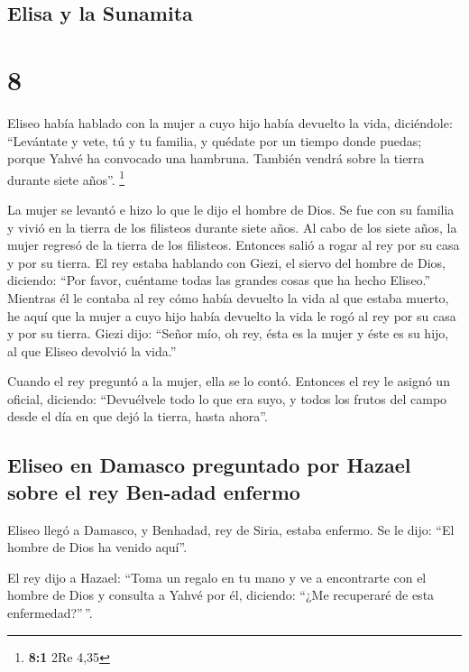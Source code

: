 \hypertarget{elisa-y-la-sunamita}{%
\subsection{Elisa y la Sunamita}\label{elisa-y-la-sunamita}}

\hypertarget{section-7}{%
\section{8}\label{section-7}}

 Eliseo había hablado con la mujer a cuyo hijo había
devuelto la vida, diciéndole: ``Levántate y vete, tú y tu familia, y
quédate por un tiempo donde puedas; porque Yahvé ha convocado una
hambruna. También vendrá sobre la tierra durante siete años''.
\footnote{\textbf{8:1} 2Re 4,35}

 La mujer se levantó e hizo lo que le dijo el hombre de
Dios. Se fue con su familia y vivió en la tierra de los filisteos
durante siete años.  Al cabo de los siete años, la mujer
regresó de la tierra de los filisteos. Entonces salió a rogar al rey por
su casa y por su tierra.  El rey estaba hablando con
Giezi, el siervo del hombre de Dios, diciendo: ``Por favor, cuéntame
todas las grandes cosas que ha hecho Eliseo.''  Mientras
él le contaba al rey cómo había devuelto la vida al que estaba muerto,
he aquí que la mujer a cuyo hijo había devuelto la vida le rogó al rey
por su casa y por su tierra. Giezi dijo: ``Señor mío, oh rey, ésta es la
mujer y éste es su hijo, al que Eliseo devolvió la vida.''

 Cuando el rey preguntó a la mujer, ella se lo contó.
Entonces el rey le asignó un oficial, diciendo: ``Devuélvele todo lo que
era suyo, y todos los frutos del campo desde el día en que dejó la
tierra, hasta ahora''.

\hypertarget{eliseo-en-damasco-preguntado-por-hazael-sobre-el-rey-ben-adad-enfermo}{%
\subsection{Eliseo en Damasco preguntado por Hazael sobre el rey
Ben-adad
enfermo}\label{eliseo-en-damasco-preguntado-por-hazael-sobre-el-rey-ben-adad-enfermo}}

 Eliseo llegó a Damasco, y Benhadad, rey de Siria, estaba
enfermo. Se le dijo: ``El hombre de Dios ha venido aquí''.

 El rey dijo a Hazael: ``Toma un regalo en tu mano y ve a
encontrarte con el hombre de Dios y consulta a Yahvé por él, diciendo:
``¿Me recuperaré de esta enfermedad?''\,''.

